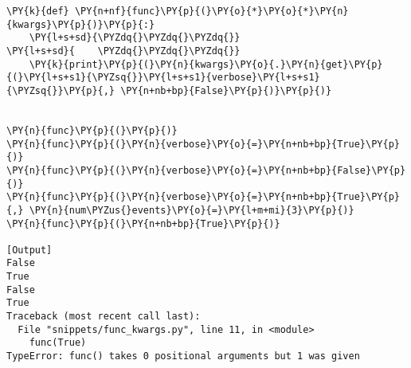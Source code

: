 \begin{Verbatim}[label=\makebox{\url{https://github.com/lucabaldini/cmepda/tree/master/slides/latex/snippets/func\_kwargs.py}},commandchars=\\\{\}]
\PY{k}{def} \PY{n+nf}{func}\PY{p}{(}\PY{o}{*}\PY{o}{*}\PY{n}{kwargs}\PY{p}{)}\PY{p}{:}
    \PY{l+s+sd}{\PYZdq{}\PYZdq{}\PYZdq{}}
\PY{l+s+sd}{    \PYZdq{}\PYZdq{}\PYZdq{}}
    \PY{k}{print}\PY{p}{(}\PY{n}{kwargs}\PY{o}{.}\PY{n}{get}\PY{p}{(}\PY{l+s+s1}{\PYZsq{}}\PY{l+s+s1}{verbose}\PY{l+s+s1}{\PYZsq{}}\PY{p}{,} \PY{n+nb+bp}{False}\PY{p}{)}\PY{p}{)}


\PY{n}{func}\PY{p}{(}\PY{p}{)}
\PY{n}{func}\PY{p}{(}\PY{n}{verbose}\PY{o}{=}\PY{n+nb+bp}{True}\PY{p}{)}
\PY{n}{func}\PY{p}{(}\PY{n}{verbose}\PY{o}{=}\PY{n+nb+bp}{False}\PY{p}{)}
\PY{n}{func}\PY{p}{(}\PY{n}{verbose}\PY{o}{=}\PY{n+nb+bp}{True}\PY{p}{,} \PY{n}{num\PYZus{}events}\PY{o}{=}\PY{l+m+mi}{3}\PY{p}{)}
\PY{n}{func}\PY{p}{(}\PY{n+nb+bp}{True}\PY{p}{)}

[Output]
False
True
False
True
Traceback (most recent call last):
  File "snippets/func_kwargs.py", line 11, in <module>
    func(True)
TypeError: func() takes 0 positional arguments but 1 was given
\end{Verbatim}